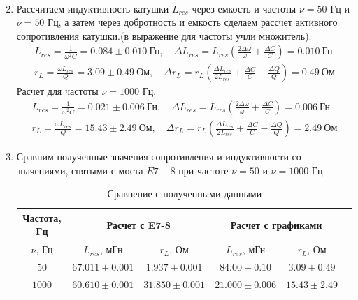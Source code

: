\documentclass[a4paper, 12pt]{article}
\begin{document}
\begin{enumerate}
\begin{align}
    \end{align}
    \item Рассчитаем индуктивность катушки $L_{res}$ через емкость и частоты $\nu = 50$ Гц и $\nu = 50$ Гц, а затем через добротность и емкость сделаем рассчет активного
    сопротивления катушки.(в выражение для частоты учли множитель).
    \begin{align}
        L_{res} = \frac{1}{\omega^{2}C} = 0.084\pm 0.010\ \text{Гн}, \quad
        \Delta L_{res} = L_{res}\left(\frac{2\Delta \omega}{\omega} + \frac{\Delta C}{C}\right) = 0.010\ \text{Гн}\\
        r_L = \frac{\omega L_{res}}{Q} = 3.09\pm 0.49\ \text{Ом},\quad
        \Delta r_L = r_L\left(\frac{\Delta L_{res}}{2L_{res}} + \frac{\Delta C}{C} - \frac{\Delta Q}{Q}\right) = 0.49\ \text{Ом}
    \end{align}
    Расчет для частоты $\nu = 1000$ Гц.
    \begin{align}
        L_{res} = \frac{1}{\omega^{2}C} = 0.021\pm 0.006\ \text{Гн}, \quad
        \Delta L_{res} = L_{res}\left(\frac{2\Delta \omega}{\omega} + \frac{\Delta C}{C}\right) = 0.006\ \text{Гн}\\
        r_L = \frac{\omega L_{res}}{Q} = 15.43\pm 2.49\ \text{Ом},\quad
        \Delta r_L = r_L\left(\frac{\Delta L_{res}}{2L_{res}} + \frac{\Delta C}{C} - \frac{\Delta Q}{Q}\right) = 2.49\ \text{Ом}
    \end{align}
    \item Сравним полученные значения сопротивления и индуктивности со значениями, снятыми с моста $E7-8$ при частоте $\nu = 50$ и $\nu = 1000$ Гц.
    \begin{table}[htbp]
        \centering
        \begin{tabular}{|c|c|c|c|c|c}
            \hline
            Частота, Гц & \multicolumn{2}{|c|}{Расчет с E7-8} & \multicolumn{2}{|c|}{Расчет с графиками}\\
            \hline
            $\nu$, Гц & $L_{res}$, мГн & $r_{L}$, Ом &  $L_{res}$, мГн & $r_{L}$, Ом\\
            $50$ & $67.011\pm 0.001$ & $1.937\pm 0.001$ & $84.00\pm 0.10$ & $3.09\pm 0.49$\\
            \hline
            $1000$ & $60.610\pm 0.001$ & $31.850\pm 0.001$ & $21.000\pm 0.006$ & $15.43\pm 2.49$\\
            \hline
        \end{tabular}
        \caption{Сравнение с полученными данными}
        \label{Сравнение с полученными данными}
    \end{table}\\

\end{enumerate}
\end{document}
